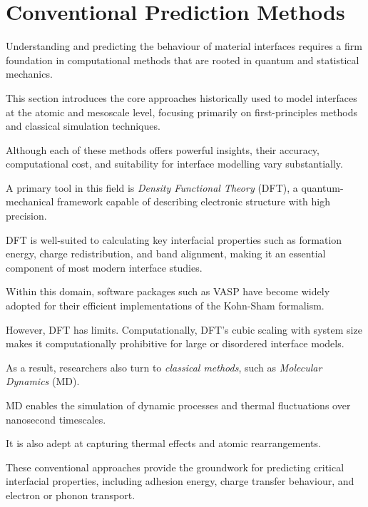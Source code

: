 \section{Conventional Prediction Methods} \label{section:conventional_methods}


Understanding and predicting the behaviour of material interfaces requires a firm foundation in computational methods
that are rooted in quantum and statistical mechanics.

This section introduces the core approaches historically used to model interfaces at the atomic and mesoscale level,
focusing primarily on first-principles methods and classical simulation techniques.

Although each of these methods offers powerful insights, their accuracy, computational cost, and suitability for
interface modelling vary substantially.


A primary tool in this field is \textit{Density Functional Theory} (DFT), a quantum-mechanical framework capable of
describing electronic structure with high precision.

DFT is well-suited to calculating key interfacial properties such as formation energy, charge redistribution, and band
alignment, making it an essential component of most modern interface studies.

Within this domain, software packages such as \textsc{VASP} have become widely adopted for their efficient
implementations of the Kohn-Sham formalism.


However, DFT has limits. Computationally, DFT's cubic scaling with system size makes it computationally prohibitive for
large or disordered interface models.

As a result, researchers also turn to \textit{classical methods}, such as \textit{Molecular Dynamics} (MD).

MD enables the simulation of dynamic processes and thermal fluctuations over nanosecond timescales.

It is also adept at capturing thermal effects and atomic rearrangements.


These conventional approaches provide the groundwork for predicting critical interfacial properties, including adhesion
energy, charge transfer behaviour, and electron or phonon transport.

